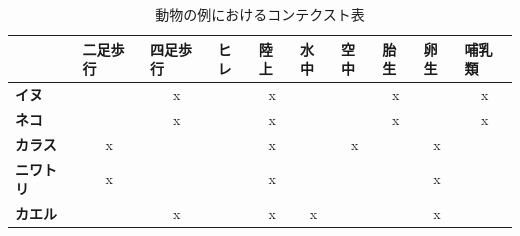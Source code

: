 \documentclass[a4j,8.5pt, twocolumn,fleqn]{jbook}
\begin{document}
\begin{table}[htb]
    \caption{動物の例におけるコンテクスト表}
    \label{context}
    \centering
    \tiny
    \begin{tabular}{|l|c|c|c|c|c|c|c|c|c|}
        \hline
        \textbf{}          & \multicolumn{1}{l|}{\textbf{二足歩行}} & \multicolumn{1}{l|}{\textbf{四足歩行}} & \multicolumn{1}{l|}{\textbf{ヒレ}} & \multicolumn{1}{l|}{\textbf{陸上}} & \multicolumn{1}{l|}{\textbf{水中}} & \multicolumn{1}{l|}{\textbf{空中}} & \multicolumn{1}{l|}{\textbf{胎生}} & \multicolumn{1}{l|}{\textbf{卵生}} & \multicolumn{1}{l|}{\textbf{哺乳類}} \\ \hline
        \textbf{イヌ}        &                                    & x                                  &                                  & x                                &                                  &                                  & x                                &                                  & x                                 \\ \hline
        \textbf{ネコ}        &                                    & x                                  &                                  & x                                &                                  &                                  & x                                &                                  & x                                 \\ \hline
        \textbf{カラス}       & x                                  &                                    &                                  & x                                &                                  & x                                &                                  & x                                &                                   \\ \hline
        \textbf{ニワトリ}      & x                                  &                                    &                                  & x                                &                                  &                                  &                                  & x                                &                                   \\ \hline
        \textbf{カエル}       &                                    & x                                  &                                  & x                                & x                                &                                  &                                  & x                                &                                   \\ \hline

\end{tabular}
\end{table}
\end{document}
